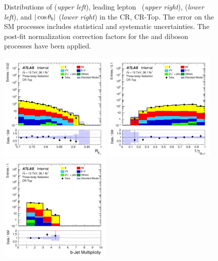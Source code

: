 \begin{figure}[!htb]
\begin{center}
        \caption{
            Distributions of \mdr (\textit{upper left}), leading lepton \pT~(\textit{upper right}),
            \dpb (\textit{lower left}), and $|\cos\theta_b|$ (\textit{lower right}) in the \ttbar CR,
            CR-Top.
            The error on the SM processes includes statistical and systematic uncertainties.
            The post-fit normalization correction factors for the \ttbar and diboson processes
            have been applied.
        }
        \label{fig:crt_0}
    \end{center}
\end{figure}
\begin{figure}[!htb]
    \begin{center}
        \includegraphics[width=0.48\textwidth]{figures/search_stop2l/bkg_est/crtop/crt_RPT}
        \includegraphics[width=0.48\textwidth]{figures/search_stop2l/bkg_est/crtop/crt_gamInvRp1}
        \includegraphics[width=0.48\textwidth]{figures/search_stop2l/bkg_est/crtop/crt_nBJets}

\end{center}
\end{figure}
